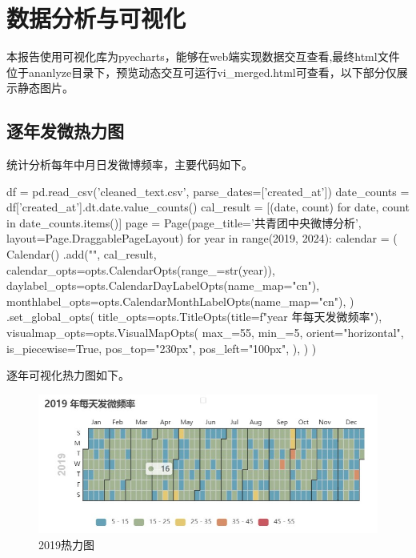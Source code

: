 \section{数据分析与可视化}
\par{本报告使用可视化库为pyecharts，能够在web端实现数据交互查看,最终html文件位于ananlyze目录下，预览动态交互可运行vi\_merged.html可查看，以下部分仅展示静态图片。}

\subsection{逐年发微热力图}
统计分析每年中月日发微博频率，主要代码如下。
\begin{python}
    df = pd.read_csv('cleaned_text.csv', parse_dates=['created_at'])
    date_counts = df['created_at'].dt.date.value_counts()
    cal_result = [(date, count) for date, count in date_counts.items()]
    page = Page(page_title='共青团中央微博分析', layout=Page.DraggablePageLayout)
    for year in range(2019, 2024):
        calendar = (
            Calendar()
            .add("",
                 cal_result,
                 calendar_opts=opts.CalendarOpts(range_=str(year)),
                 daylabel_opts=opts.CalendarDayLabelOpts(name_map="cn"),
                 monthlabel_opts=opts.CalendarMonthLabelOpts(name_map="cn"),
                 )
            .set_global_opts(
                title_opts=opts.TitleOpts(title=f"{year} 年每天发微频率"),
                visualmap_opts=opts.VisualMapOpts(
                    max_=55, min_=5, orient="horizontal", is_piecewise=True, pos_top="230px", pos_left="100px",
                ),
            )
        )
\end{python}
逐年可视化热力图如下。
\begin{figure}[H]
    \centering
    \includegraphics[width=12cm]{figure/2019.jpg}
    \caption{2019热力图} \label{fig:2019}
\end{figure}

